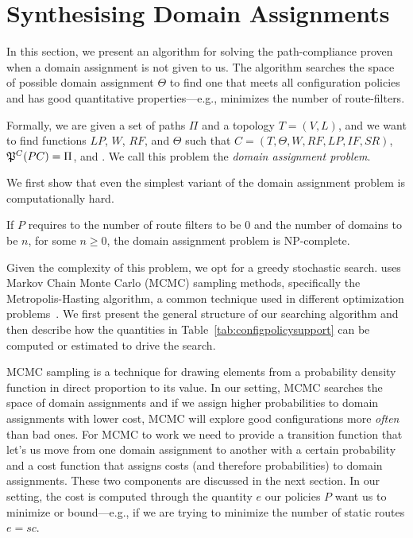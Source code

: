 \section{Synthesising Domain Assignments}
\label{sec:synth-dom-ass}

In this section, we present an algorithm for 
solving the path-compliance proven when a domain assignment is not given to us.
The algorithm searches the space of possible domain assignment $\Theta$ to find
one that meets all configuration policies and has good quantitative properties---e.g., minimizes
the number of route-filters.

Formally, we are given a set of paths $\Pi$ and 
a topology $T=(V,L)$,
and we want to find functions
$LP$, $W$, $RF$,  and $\Theta$ such that
$C=(T,\Theta,W,RF,LP,IF,SR)$,
$\mathfrak{P}^C(PC) = \Pi$, and
.
We call this problem the \emph{domain assignment problem}.


We first show that even the simplest variant of the domain assignment problem
is computationally hard.
\begin{theorem}
If $P$ requires to the number of route filters to be 0
and the number of domains to be $n$, for some $n\geq 0$,
the domain assignment problem is NP-complete.
\end{theorem}

Given the complexity of this problem, we opt for a greedy
stochastic search.
\name uses Markov
Chain Monte Carlo (MCMC) sampling methods, specifically the Metropolis-Hasting
algorithm, a common technique used in different optimization 
problems~\cite{stoke}. 
We first present the general structure of our searching algorithm and 
then describe how the quantities in Table~\ref{tab:configpolicysupport} can be computed
or estimated to drive the search.

MCMC sampling is a technique for 
drawing elements from a
probability density function in direct proportion to its value.
In our setting, MCMC searches the space of domain assignments and
if we assign higher probabilities to domain assignments with lower cost, MCMC will explore
good configurations more \emph{often} than bad ones.
For MCMC to work we need to provide a transition function that let's us move from one domain assignment
to another with a certain probability and a cost function that assigns costs (and therefore probabilities) to
domain assignments. These two components are discussed in the next section.
In our setting, the cost is computed through the quantity $e$ our policies $P$ want us to minimize or bound---e.g.,
if we are trying to minimize the number of static routes $e=sc$.



